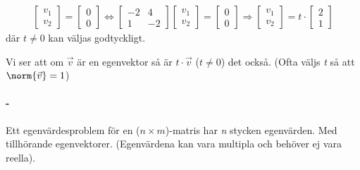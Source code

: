 \begin{Ex}
\begin{gather*}
		\begin{bmatrix}
		    v_1\\
		    v_2
		\end{bmatrix} = 
		\begin{bmatrix}
		    0 \\
		    0
		\end{bmatrix}
		\Leftrightarrow
		\begin{bmatrix}
		    -2 & 4\\
		    1 & -2
		\end{bmatrix}
		\begin{bmatrix}
		    v_1\\
		    v_2
		\end{bmatrix} = 
		\begin{bmatrix}
		    0\\
		    0
		\end{bmatrix} \Rightarrow 
		\begin{bmatrix}
		    v_1\\
		    v_2
		\end{bmatrix}
		= t \cdot 
		\begin{bmatrix}
		    2\\
		    1
		\end{bmatrix}
	\end{gather*}
	där $t \neq 0$ kan väljas godtyckligt.\\
\end{Ex}
Vi ser att om $\vec{v}$ är en egenvektor så är $t \cdot \vec{v}$ ($t \neq 0$) det också. (Ofta väljs \textit{t} så att $\norm{\vec{v}} = 1$)
\paragraph{-} %
\label{par:_1}
Ett egenvärdesproblem för en ($n \times m$)-matris har \textit{n} stycken egenvärden. Med tillhörande egenvektorer. (Egenvärdena kan vara multipla och behöver ej vara reella).


